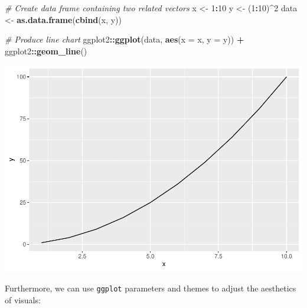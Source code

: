 \documentclass[]{book}
\newenvironment{Shaded}{\begin{snugshade}}{\end{snugshade}}
\newcommand{\CommentTok}[1]{\textcolor[rgb]{0.56,0.35,0.01}{\textit{#1}}}
\newcommand{\DataTypeTok}[1]{\textcolor[rgb]{0.13,0.29,0.53}{#1}}
\newcommand{\DecValTok}[1]{\textcolor[rgb]{0.00,0.00,0.81}{#1}}
\newcommand{\KeywordTok}[1]{\textcolor[rgb]{0.13,0.29,0.53}{\textbf{#1}}}
\newcommand{\NormalTok}[1]{#1}
\newcommand{\OperatorTok}[1]{\textcolor[rgb]{0.81,0.36,0.00}{\textbf{#1}}}
\newcommand{\StringTok}[1]{\textcolor[rgb]{0.31,0.60,0.02}{#1}}
\begin{document}
\begin{Shaded}
\begin{Highlighting}[]
\CommentTok{# Create data frame containing two related vectors}
\NormalTok{x <-}\StringTok{ }\DecValTok{1}\OperatorTok{:}\DecValTok{10}
\NormalTok{y <-}\StringTok{ }\NormalTok{(}\DecValTok{1}\OperatorTok{:}\DecValTok{10}\NormalTok{)}\OperatorTok{^}\DecValTok{2}
\NormalTok{data <-}\StringTok{ }\KeywordTok{as.data.frame}\NormalTok{(}\KeywordTok{cbind}\NormalTok{(x, y))}

\CommentTok{# Produce line chart}
\NormalTok{ggplot2}\OperatorTok{::}\KeywordTok{ggplot}\NormalTok{(data, }\KeywordTok{aes}\NormalTok{(}\DataTypeTok{x =}\NormalTok{ x, }\DataTypeTok{y =}\NormalTok{ y)) }\OperatorTok{+}
\NormalTok{ggplot2}\OperatorTok{::}\KeywordTok{geom_line}\NormalTok{()}
\end{Highlighting}
\end{Shaded}

\includegraphics{People_Analytics_Lifecycle_files/figure-latex/unnamed-chunk-51-1.pdf}

Furthermore, we can use \texttt{ggplot} parameters and themes to adjust the aesthetics of visuals:
\end{document}
